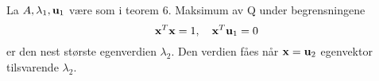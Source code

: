 La $A, \lambda_1, \mathbf{u}_1$ være som i teorem 6.
Maksimum av Q under begrensningene
$$\mathbf{x}^T\mathbf{x}=1, \quad \mathbf{x}^T\mathbf{u}_1=0$$
er den nest største egenverdien $\lambda_2$.
Den verdien fåes når $\mathbf{x}=\mathbf{u}_2$ egenvektor tilsvarende $\lambda_2$.
